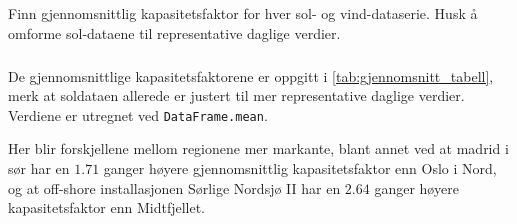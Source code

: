 \documentclass{article}
\begin{document}
\newpage
\subsection{}
Finn gjennomsnittlig kapasitetsfaktor for hver sol- og vind-dataserie. Husk å omforme sol-dataene til representative daglige verdier.

\subsubsection{}
De gjennomsnittlige kapasitetsfaktorene er oppgitt i \autoref{tab:gjennomsnitt_tabell}, merk at soldataen allerede er justert til mer representative daglige verdier.
Verdiene er utregnet ved \verb|DataFrame.mean|.

\begin{table}[h]
\centering
{}
\qquad
{}
\caption{Gjennomsnittlige kapasitetsfaktorer per lokasjon og teknologi.}
\label{tab:gjennomsnitt_tabell}
\end{table}

Her blir forskjellene mellom regionene mer markante, blant annet ved at madrid i sør har en $1.71$ ganger høyere gjennomsnittlig kapasitetsfaktor enn Oslo i Nord, og at off-shore installasjonen Sørlige Nordsjø II har en $2.64$ ganger høyere kapasitetsfaktor enn Midtfjellet.
\end{document}
